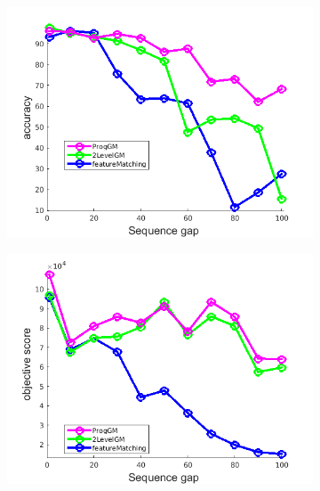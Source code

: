 \begin{figure}[h] 
	\begin{subfigure}[b]{0.3\textwidth}
		\centering
		\includegraphics[scale=0.25]{"chapter3/fig/HouseSeq/anchor_descr/using_cpd_afftrafo/ext_solution/performance/accuracy"} 
	\end{subfigure}%
	\begin{subfigure}[b]{0.3\textwidth}
		\centering
		\includegraphics[scale=0.25]{"chapter3/fig/HouseSeq/anchor_descr/using_cpd_afftrafo/ext_solution/performance/score"}  
	\end{subfigure} 
	\begin{subfigure}[b]{0.3\textwidth}
		\centering

\end{subfigure}
\end{figure}
